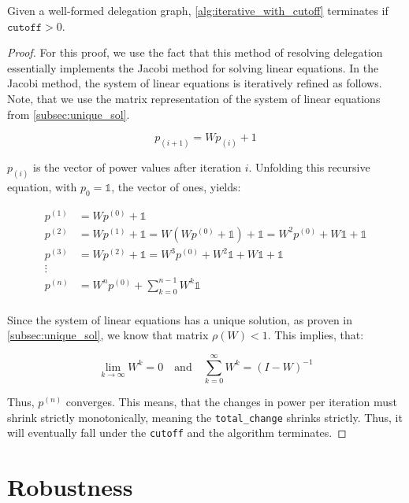 \begin{lemma}\label{lem:iterative_alg_power_concentrates}
Given a well-formed delegation graph, \cref{alg:iterative_with_cutoff} terminates if $\texttt{cutoff} > 0$.
\end{lemma}
\begin{proof}

For this proof, we use the fact that this method of resolving delegation essentially implements the Jacobi method for solving linear equations. In the Jacobi method, the system of linear equations is iteratively refined as follows. Note, that we use the matrix representation of the system of linear equations from \cref{subsec:unique_sol}.

\[
p_{(i + 1)} = Wp_{(i)} + 1
\]

$p_{(i)}$ is the vector of power values after iteration $i$. Unfolding this recursive equation, with $p_0 = \mathbb{1} $, the vector of ones, yields:

\begin{align*}
p^{(1)} &= W p^{(0)} + \mathbb{1} \\
p^{(2)} &= W p^{(1)} + \mathbb{1} = W(W p^{(0)} + \mathbb{1}) + \mathbb{1} = W^2 p^{(0)} + W \mathbb{1} + \mathbb{1} \\
p^{(3)} &= W p^{(2)} + \mathbb{1} = W^3 p^{(0)} + W^2 \mathbb{1} + W \mathbb{1} + \mathbb{1} \\
\vdots \\
p^{(n)} &= W^n p^{(0)} + \sum_{k=0}^{n-1} W^k \mathbb{1} \\
\end{align*}


Since the system of linear equations has a unique solution, as proven in \cref{subsec:unique_sol}, we know that matrix $\rho(W) < 1$. This implies, that:

\[
\lim_{k \to \infty} W^k = 0 \quad \text{and} \quad \sum_{k=0}^{\infty} W^k = (I - W)^{-1}
\]

Thus, $p^{(n)}$ converges. This means, that the changes in power per iteration must shrink strictly monotonically, meaning the \texttt{total\_change} shrinks strictly. Thus, it will eventually fall under the \texttt{cutoff} and the algorithm terminates. 

\end{proof}

\section{Robustness}

